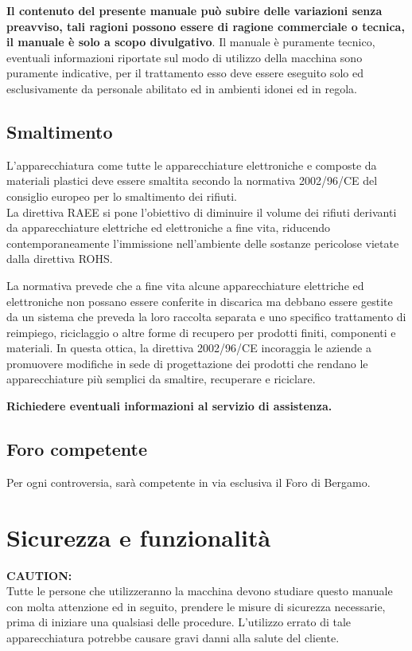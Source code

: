 \documentclass[a4paper]{article}
\begin{document}
\textbf{Il contenuto del presente manuale può subire delle variazioni senza preavviso, tali ragioni possono essere di ragione commerciale o tecnica, il manuale è solo a scopo divulgativo}. Il manuale è puramente tecnico, eventuali informazioni riportate sul modo di utilizzo della macchina sono puramente indicative, per il trattamento esso deve essere eseguito solo ed esclusivamente da personale abilitato ed in ambienti idonei ed in regola.

\subsection{Smaltimento}
L'apparecchiatura come tutte le apparecchiature elettroniche e composte da materiali plastici deve essere smaltita secondo la normativa 2002/96/CE del consiglio europeo per lo smaltimento dei rifiuti.\\
La direttiva RAEE si pone l'obiettivo di diminuire il volume dei rifiuti derivanti da apparecchiature elettriche ed elettroniche a fine vita, riducendo contemporaneamente l'immissione nell'ambiente delle sostanze pericolose vietate dalla direttiva ROHS.

La normativa prevede che a fine vita alcune apparecchiature elettriche ed elettroniche non possano essere conferite in discarica ma debbano essere gestite da un sistema che preveda la loro raccolta separata e uno specifico trattamento di reimpiego, riciclaggio o altre forme di recupero per prodotti finiti, componenti e materiali. In questa ottica, la direttiva 2002/96/CE incoraggia le aziende a promuovere modifiche in sede di progettazione dei prodotti che rendano le apparecchiature più semplici da smaltire, recuperare e riciclare.

\textbf{Richiedere eventuali informazioni al servizio di assistenza.}

\subsection{Foro competente}
Per ogni controversia, sarà competente in via esclusiva il Foro di Bergamo.

\section{Sicurezza e funzionalità}
\noindent \faExclamationTriangle \textbf{CAUTION:}
\\
Tutte le persone che utilizzeranno la macchina devono studiare questo manuale con molta attenzione ed in seguito, prendere le misure di sicurezza necessarie, prima di iniziare una qualsiasi delle procedure. L'utilizzo errato di tale apparecchiatura potrebbe causare gravi danni alla salute del cliente.
\end{document}

